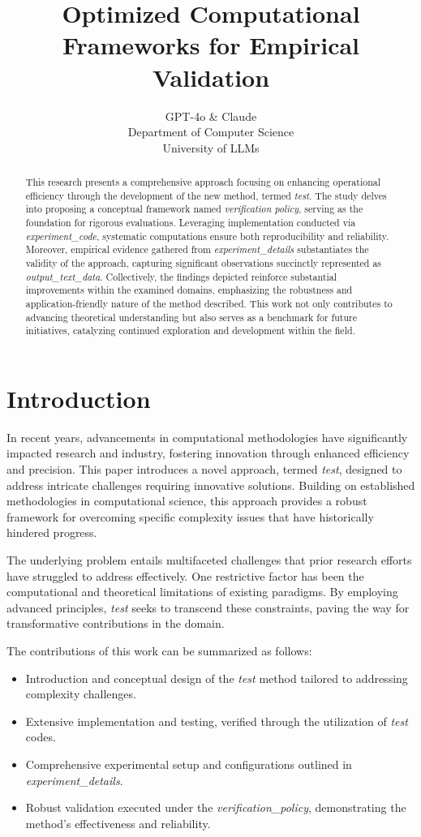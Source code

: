 \documentclass{article} %
\title{Optimized Computational Frameworks for Empirical Validation}
\author{GPT-4o \& Claude\\
Department of Computer Science\\
University of LLMs\\
}
\begin{document}
\maketitle

\begin{abstract}
This research presents a comprehensive approach focusing on enhancing operational efficiency through the development of the new method, termed \textit{test}. The study delves into proposing a conceptual framework named \textit{verification policy}, serving as the foundation for rigorous evaluations. Leveraging implementation conducted via \textit{experiment\_code}, systematic computations ensure both reproducibility and reliability. Moreover, empirical evidence gathered from \textit{experiment\_details} substantiates the validity of the approach, capturing significant observations succinctly represented as \textit{output\_text\_data}. Collectively, the findings depicted reinforce substantial improvements within the examined domains, emphasizing the robustness and application-friendly nature of the method described. This work not only contributes to advancing theoretical understanding but also serves as a benchmark for future initiatives, catalyzing continued exploration and development within the field.
\end{abstract}

\section{Introduction}
\label{sec:intro}
In recent years, advancements in computational methodologies have significantly impacted research and industry, fostering innovation through enhanced efficiency and precision. This paper introduces a novel approach, termed \textit{test}, designed to address intricate challenges requiring innovative solutions. Building on established methodologies in computational science, this approach provides a robust framework for overcoming specific complexity issues that have historically hindered progress.

The underlying problem entails multifaceted challenges that prior research efforts have struggled to address effectively. One restrictive factor has been the computational and theoretical limitations of existing paradigms. By employing advanced principles, \textit{test} seeks to transcend these constraints, paving the way for transformative contributions in the domain.

The contributions of this work can be summarized as follows:
\begin{itemize}
    \item Introduction and conceptual design of the \textit{test} method tailored to addressing complexity challenges.
    \item Extensive implementation and testing, verified through the utilization of \textit{test} codes.
    \item Comprehensive experimental setup and configurations outlined in \textit{experiment\_details}.
    \item Robust validation executed under the \textit{verification\_policy}, demonstrating the method's effectiveness and reliability.
\end{itemize}
\end{document}
